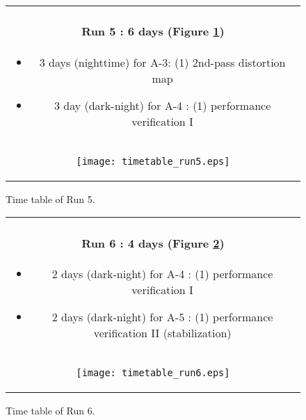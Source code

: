 \begin{figure}[!ht]
\begin{center}
\begin{tabular}{c}
\begin{minipage}{0.95\hsize}
\paragraph{Run 5 : 6 days  (Figure \ref{fig:run5})}
	\begin{itemize}
	\item 3 days (nighttime) for A-3:
	(1) 2nd-pass distortion map
	\item 3 day (dark-night) for A-4 :
	(1) performance verification I
	\end{itemize}
\end{minipage} \\
\begin{minipage}{0.8\hsize}
	\begin{center}
	\vspace*{5mm}
	\texttt{[image: timetable\_run5.eps]}
	\end{center}
	\vspace*{-5mm}
	\caption{Time table of Run 5.}
	\label{fig:run5}
\end{minipage}
\end{tabular}
\end{center}
\end{figure}

\begin{figure}[!ht]
\begin{center}
\begin{tabular}{c}
\begin{minipage}{0.95\hsize}
\paragraph{Run 6 : 4 days  (Figure \ref{fig:run6})}
	\begin{itemize}
	\item 2 days (dark-night) for A-4 : 
	(1) performance verification I
	\item 2 days (dark-night) for A-5 :
	(1) performance verification II (stabilization)
	\end{itemize}
\end{minipage} \\
\begin{minipage}{0.8\hsize}
	\begin{center}
	\vspace*{5mm}
	\texttt{[image: timetable\_run6.eps]}
	\end{center}
	\vspace*{-5mm}
	\caption{Time table of Run 6.}
	\label{fig:run6}
\end{minipage}
\end{tabular}
\end{center}
\end{figure}

